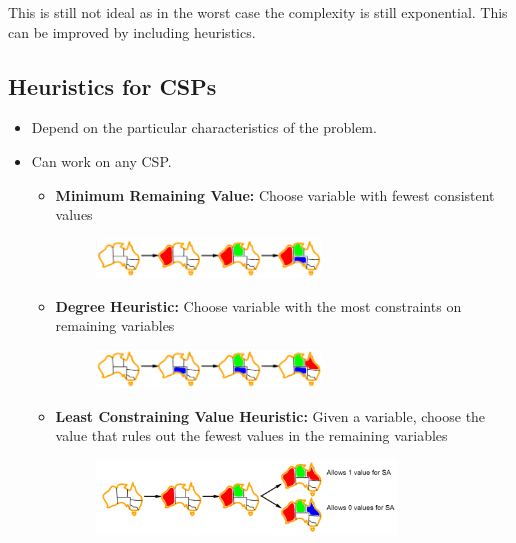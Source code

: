 \documentclass[
../../EiKI_Summary.tex,
]
{subfiles}
\begin{document}
This is still not ideal as in the worst case the complexity is still exponential. This can be improved by including heuristics.

\newpage
\subsection{Heuristics for CSPs}
\begin{itemize}
    \item {} Depend on the particular characteristics of the problem.
    \item {} Can work on any CSP.
    \begin{itemize}
        \item \textbf{Minimum Remaining Value:} Choose variable with fewest consistent values
        \begin{figure}
            [H]
            \centering
            \includegraphics[width=0.6\textwidth]{Pics/05/MinimumRemainingValuesHeuristic.png}
        \end{figure}
        \item \textbf{Degree Heuristic:} Choose variable with the most constraints on remaining variables
        \begin{figure}
            [H]
            \centering
            \includegraphics[width=0.6\textwidth]{Pics/05/DegreeHeuristic.png}
        \end{figure}
        \item \textbf{Least Constraining Value Heuristic:} Given a variable, choose the value that rules out the fewest values in the remaining variables
        \begin{figure}
            [H]
            \centering
            \includegraphics[width=0.8\textwidth]{Pics/05/LeastConstrainingValueHeuristic.png}
        \end{figure}
    \end{itemize}
\end{itemize}
\end{document}
